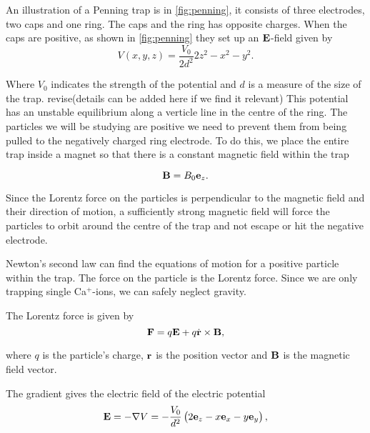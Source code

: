 An illustration of a Penning trap is in \autoref{fig:penning}, it
consists of three electrodes, two caps and one ring.
The caps and the ring has opposite charges. When the caps are positive, as shown in \autoref{fig:penning}
they set up an $\bold{E}$-field given by
\begin{equation}
V(x, y, z) = \frac{V_0}{2d^2}{2z^2 - x^2 - y^2}.
\end{equation}

Where $V_0$ indicates the strength of the potential and $d$ is a measure of the size of the trap.
revise(details can be added here if we find it relevant)
This potential has an unstable equilibrium along a verticle line in the centre of the ring.
The particles we will be studying are positive we need to prevent them from being pulled to the negatively
charged ring electrode. To do this, we place the entire trap inside a magnet so that there is a constant
magnetic field within the trap

\begin{equation}
\bold{B} = B_0 \bold{e}_z.
\end{equation}

Since the Lorentz force on the particles is perpendicular to the magnetic field and their direction of
motion, a sufficiently strong magnetic field will force the particles to orbit around the centre of the trap
and not escape or hit the negative electrode.

Newton's second law can find the equations of motion for a positive particle within the trap. The
force on the particle is the Lorentz force. Since we are only trapping
single Ca$^+$-ions, we can safely neglect gravity.

The Lorentz force is given by
\begin{equation}
\bold{F} = q\bold{E} + q\dot{\bold{r}} \times \bold{B},
\end{equation}

where $q$ is the particle's charge, $\bold{r}$ is the position vector and $\bold{B}$ is the magnetic field vector.

The gradient gives the electric field
of the electric potential
\begin{equation}
\bold{E} = -\nabla V = -\frac{V_0}{d^2}\left(2 \bold{e}_z - x\bold{e}_x - y\bold{e}_y\right),
\end{equation}

